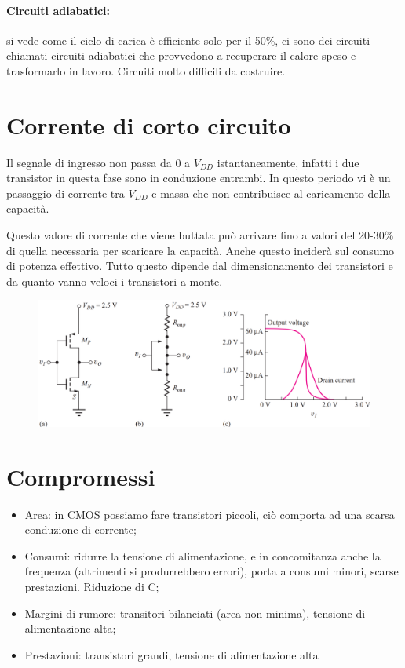 \paragraph{Circuiti adiabatici:} si vede come il ciclo di carica è efficiente solo per il 50\%, ci sono dei circuiti chiamati circuiti adiabatici che provvedono a recuperare il calore speso e trasformarlo in lavoro. Circuiti molto difficili da costruire.

\newpage
\section{Corrente di corto circuito}

Il	segnale di	ingresso non	passa da	0	a	$V_{DD}$ istantaneamente, infatti i due transistor in questa fase sono in conduzione entrambi. In questo periodo vi è un passaggio di corrente tra $V_{DD}$ e massa che non contribuisce al caricamento della capacità. 

Questo valore di corrente che viene buttata può arrivare fino a valori del 20-30\% di quella necessaria per scaricare la capacità. Anche questo inciderà sul consumo di potenza effettivo. Tutto questo dipende dal dimensionamento dei transistori e da quanto vanno veloci i transistori a monte.

\begin{figure}[htbp]
    \centering
    \includegraphics[width=0.9\linewidth]{img/non_step_ingresso.png}
\end{figure}


\section{Compromessi}

\begin{itemize}
    \item Area: in CMOS possiamo fare transistori piccoli, ciò comporta ad una scarsa conduzione di corrente;
    \item Consumi: ridurre la tensione di alimentazione, e in concomitanza anche la frequenza (altrimenti si produrrebbero errori), porta a consumi minori, scarse prestazioni. Riduzione di C;
    \item Margini di rumore: transitori bilanciati (area non minima), tensione di alimentazione alta;
    \item Prestazioni: transistori grandi, tensione di alimentazione alta
\end{itemize}


